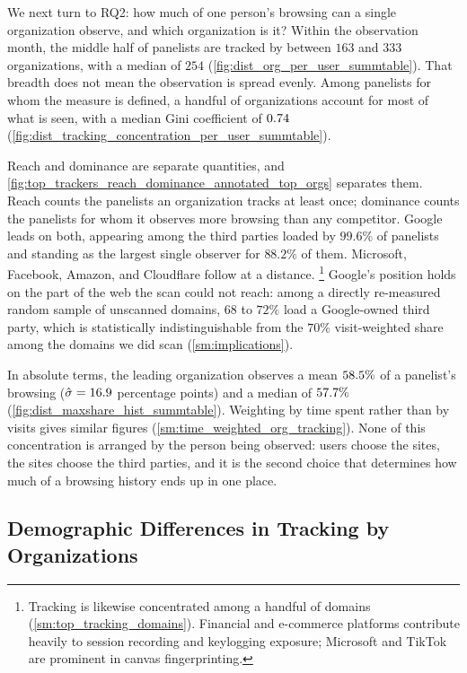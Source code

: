 \documentclass[12pt, letterpaper]{article}
\begin{document}
We next turn to RQ2: how much of one person's browsing can a single organization observe, and which organization is it? Within the observation month, the middle half of panelists are tracked by between $163$ and $333$ organizations, with a median of $254$ (\cref{fig:dist_org_per_user_summtable}). That breadth does not mean the observation is spread evenly. Among panelists for whom the measure is defined, a handful of organizations account for most of what is seen, with a median Gini coefficient of $0.74$ (\cref{fig:dist_tracking_concentration_per_user_summtable}).
 
Reach and dominance are separate quantities, and \cref{fig:top_trackers_reach_dominance_annotated_top_orgs} separates them.
Reach counts the panelists an organization tracks at least once; dominance counts the panelists for whom it observes more browsing than any competitor.
Google leads on both, appearing among the third parties loaded by $99.6\%$ of panelists and standing as the largest single observer for $88.2\%$ of them.
Microsoft, Facebook, Amazon, and Cloudflare follow at a distance.%
\footnote{
    Tracking is likewise concentrated among a handful of domains (\cref{sm:top_tracking_domains}). Financial and e-commerce platforms contribute heavily to session recording and keylogging exposure; Microsoft and TikTok are prominent in canvas fingerprinting.
}
Google's position holds on the part of the web the scan could not reach: among a directly re-measured random sample of unscanned domains, $68$ to $72\%$ load a Google-owned third party, which is statistically indistinguishable from the $70\%$ visit-weighted share among the domains we did scan (\cref{sm:implications}).
 
In absolute terms, the leading organization observes a mean $58.5\%$ of a panelist's browsing ($\hat{\sigma} = 16.9$ percentage points) and a median of $57.7\%$ (\cref{fig:dist_maxshare_hist_summtable}).
Weighting by time spent rather than by visits gives similar figures (\cref{sm:time_weighted_org_tracking}).
None of this concentration is arranged by the person being observed: users choose the sites, the sites choose the third parties, and it is the second choice that determines how much of a browsing history ends up in one place.

\subsection{Demographic Differences in Tracking by Organizations}
\label{sec:demo_diff_organizations}
\end{document}
